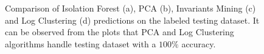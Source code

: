 \begin{figure}%
    \centering
    \qquad
    \qquad
    \qquad
    \caption{Comparison of Isolation Forest (a), PCA (b), Invariants Mining (c) and Log Clustering (d) predictions on the labeled testing dataset. It can be observed from the plots that PCA and Log Clustering algorithms handle testing dataset with a $100 \%$ accuracy.}%
    \label{fig:tsne-predictions-labeled}%
\end{figure}


